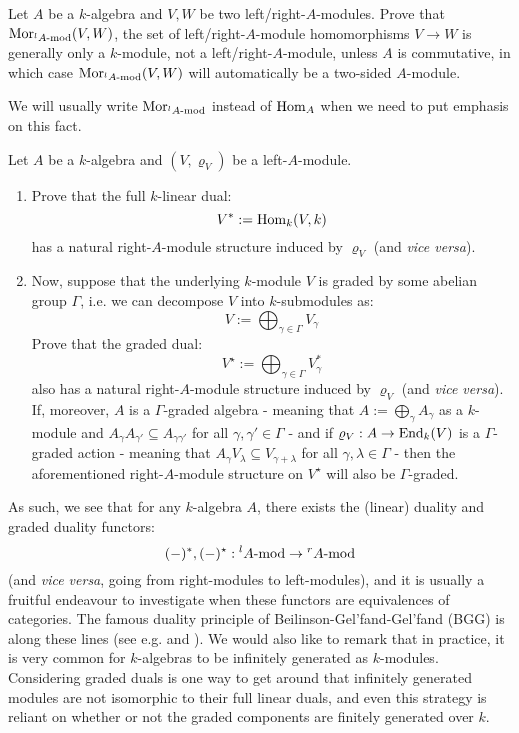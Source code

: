         \begin{question}
            Let $A$ be a $k$-algebra and $V, W$ be two left/right-$A$-modules. Prove that $\Mor_{ {}^lA\mod }(V, W)$, the set of left/right-$A$-module homomorphisms $V \to W$ is generally only a $k$-module, not a left/right-$A$-module, unless $A$ is commutative, in which case $\Mor_{ {}^lA\mod }(V, W)$ will automatically be a two-sided $A$-module.

            We will usually write $\Mor_{ {}^lA\mod }$ instead of $\Hom_A$ when we need to put emphasis on this fact. 
        \end{question}
        \begin{question}
            Let $A$ be a $k$-algebra and $(V, \varrho_V)$ be a left-$A$-module.
            \begin{enumerate}
                \item Prove that the full $k$-linear dual:
                    $$V^* := \Hom_k(V, k)$$
                has a natural right-$A$-module structure induced by $\varrho_V$ (and \textit{vice versa}).
                \item Now, suppose that the underlying $k$-module $V$ is graded by some abelian group $\Gamma$, i.e. we can decompose $V$ into $k$-submodules as:
                    $$V := \bigoplus_{\gamma \in \Gamma} V_{\gamma}$$
                Prove that the graded dual:
                    $$V^{\star} := \bigoplus_{\gamma \in \Gamma} V_{\gamma}^*$$
                also has a natural right-$A$-module structure induced by $\varrho_V$ (and \textit{vice versa}). If, moreover, $A$ is a $\Gamma$-graded algebra - meaning that $A := \bigoplus_{\gamma} A_{\gamma}$ as a $k$-module and $A_{\gamma} A_{\gamma'} \subseteq A_{\gamma \gamma'}$ for all $\gamma, \gamma' \in \Gamma$ - and if $\varrho_V: A \to \End_k(V)$ is a $\Gamma$-graded action - meaning that $A_{\gamma} V_{\lambda} \subseteq V_{\gamma + \lambda}$ for all $\gamma, \lambda \in \Gamma$ - then the aforementioned right-$A$-module structure on $V^{\star}$ will also be $\Gamma$-graded.
            \end{enumerate}
        \end{question}
        As such, we see that for any $k$-algebra $A$, there exists the (linear) duality and graded duality functors:
            $$(-)^*, (-)^{\star}: {}^lA\mod \to {}^rA\mod$$
        (and \textit{vice versa}, going from right-modules to left-modules), and it is usually a fruitful endeavour to investigate when these functors are equivalences of categories. The famous duality principle of Beilinson-Gel'fand-Gel'fand (BGG) is along these lines (see e.g. \cite[Chapter 3]{humphreys_category_O} and \cite[Sections 2.6 and 6.7]{moody_pianzola_lie_algebras_with_triangular_decompositions}). We would also like to remark that in practice, it is very common for $k$-algebras to be infinitely generated as $k$-modules. Considering graded duals is one way to get around that infinitely generated modules are not isomorphic to their full linear duals, and even this strategy is reliant on whether or not the graded components are finitely generated over $k$.
